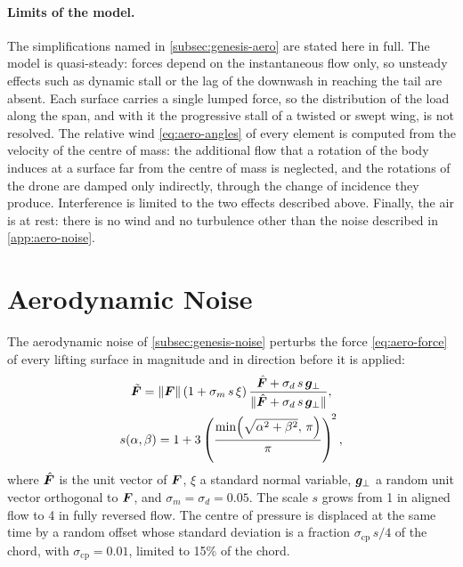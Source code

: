 \paragraph{Limits of the model.} The simplifications named in \autoref{subsec:genesis-aero} are stated here in full. The model is quasi-steady: forces depend on the instantaneous flow only, so unsteady effects such as dynamic stall or the lag of the downwash in reaching the tail are absent. Each surface carries a single lumped force, so the distribution of the load along the span, and with it the progressive stall of a twisted or swept wing, is not resolved. The relative wind \eqref{eq:aero-angles} of every element is computed from the velocity of the centre of mass: the additional flow that a rotation of the body induces at a surface far from the centre of mass is neglected, and the rotations of the drone are damped only indirectly, through the change of incidence they produce. Interference is limited to the two effects described above. Finally, the air is at rest: there is no wind and no turbulence other than the noise described in \autoref{app:aero-noise}.

\section{Aerodynamic Noise}
\label{app:aero-noise}

The aerodynamic noise of \autoref{subsec:genesis-noise} perturbs the force \eqref{eq:aero-force} of every lifting surface in magnitude and in direction before it is applied:
\begin{equation}
\begin{gathered}
\tilde{\bm{F}} = \lVert \bm{F} \rVert \left(1 + \sigma_m\, s\, \xi\right) \frac{\hat{\bm{F}} + \sigma_d\, s\, \bm{g}_{\perp}}{\lVert \hat{\bm{F}} + \sigma_d\, s\, \bm{g}_{\perp} \rVert}, \\
s(\alpha, \beta) = 1 + 3 \left( \frac{\min\!\left(\sqrt{\alpha^2 + \beta^2},\, \pi\right)}{\pi} \right)^{\!2},
\end{gathered}
\label{eq:aero-noise}
\end{equation}
where $\hat{\bm{F}}$ is the unit vector of $\bm{F}$, $\xi$ a standard normal variable, $\bm{g}_{\perp}$ a random unit vector orthogonal to $\bm{F}$, and $\sigma_m = \sigma_d = 0.05$. The scale $s$ grows from 1 in aligned flow to 4 in fully reversed flow. The centre of pressure is displaced at the same time by a random offset whose standard deviation is a fraction $\sigma_{\mathrm{cp}}\, s / 4$ of the chord, with $\sigma_{\mathrm{cp}} = 0.01$, limited to 15\% of the chord.

